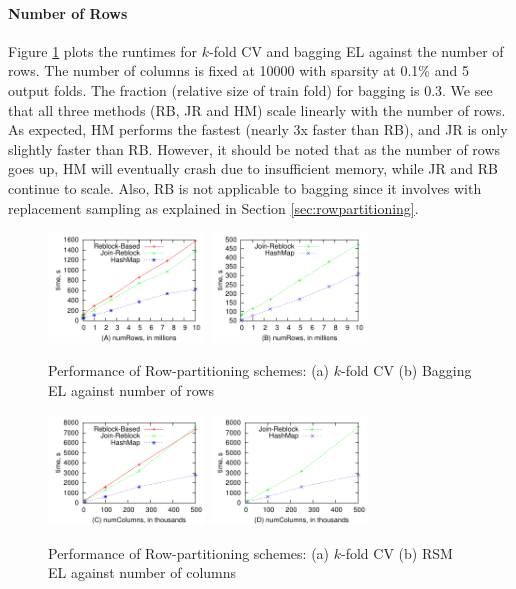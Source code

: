 \documentclass{vldb}
\begin{document}
\paragraph*{Number of Rows}
Figure \ref{fig:row:row} plots
the runtimes for $k$-fold CV and bagging EL against the number of rows. The number of
columns is fixed at 10000 with sparsity at 0.1\% and 5 output folds. The fraction
(relative size of train fold) for bagging is 0.3.
We see that all three methods (RB, JR and HM) scale linearly with the number of rows.
As expected, HM performs the fastest (nearly 3x faster than RB), and JR is only slightly
faster than RB. However, it should be noted that as the number of rows goes up, HM will
eventually crash due to insufficient memory, while JR and RB continue to scale. Also,
RB is not applicable to bagging since it involves with replacement sampling as explained
in Section \ref{sec:rowpartitioning}.

\begin{figure}[h]
\centering
\includegraphics[width=1.64in]{row/row-cv.pdf}
\includegraphics[width=1.64in]{row/row-el.pdf}
\caption{Performance of Row-partitioning schemes: (a) $k$-fold CV (b) Bagging EL against
number of rows}
\label{fig:row:row}
\end{figure}

\begin{figure}[h]
\centering
\includegraphics[width=1.64in]{row/col-cv.pdf}
\includegraphics[width=1.64in]{row/col-el.pdf}
\caption{Performance of Row-partitioning schemes: (a) $k$-fold CV (b) RSM EL against
number of columns}
\label{fig:row:column}
\end{figure}
\end{document}
